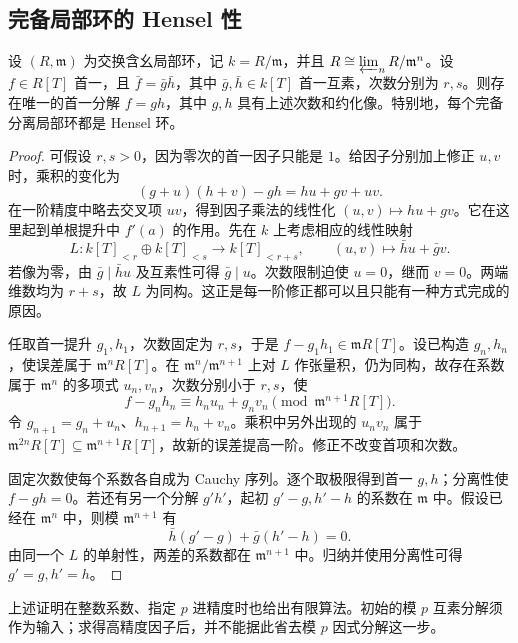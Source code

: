 \subsection{完备局部环的 Hensel 性}
\label{b3:subsec:2301:02}

\begin{theorem}\label{b3:thm:hensel-factor-lifting}
	设 \((R,\mathfrak m)\) 为交换含幺局部环，记 \(k=R/\mathfrak m\)，并且 \(R\cong\varprojlim_n R/\mathfrak m^n\)。设 \(f\in R[T]\) 首一，且 \(\bar f=\bar g\bar h\)，其中 \(\bar g,\bar h\in k[T]\) 首一互素，次数分别为 \(r,s\)。则存在唯一的首一分解 \(f=gh\)，其中 \(g,h\) 具有上述次数和约化像。特别地，每个完备分离局部环都是 Hensel 环。
\end{theorem}
\begin{proof}
	可假设 \(r,s>0\)，因为零次的首一因子只能是 \(1\)。给因子分别加上修正 \(u,v\) 时，乘积的变化为
	\[
		(g+u)(h+v)-gh=hu+gv+uv.
	\]
	在一阶精度中略去交叉项 \(uv\)，得到因子乘法的线性化 \((u,v)\mapsto hu+gv\)。它在这里起到单根提升中 \(f'(a)\) 的作用。先在 \(k\) 上考虑相应的线性映射
	\[
		L:k[T]_{<r}\oplus k[T]_{<s}\longrightarrow k[T]_{<r+s}, \qquad (u,v)\longmapsto\bar h u+\bar g v.
	\]
	若像为零，由 \(\bar g\mid\bar h u\) 及互素性可得 \(\bar g\mid u\)。次数限制迫使 \(u=0\)，继而 \(v=0\)。两端维数均为 \(r+s\)，故 \(L\) 为同构。这正是每一阶修正都可以且只能有一种方式完成的原因。

	任取首一提升 \(g_1,h_1\)，次数固定为 \(r,s\)，于是 \(f-g_1h_1\in\mathfrak m R[T]\)。设已构造 \(g_n,h_n\)，使误差属于 \(\mathfrak m^nR[T]\)。在 \(\mathfrak m^n/\mathfrak m^{n+1}\) 上对 \(L\) 作张量积，仍为同构，故存在系数属于 \(\mathfrak m^n\) 的多项式 \(u_n,v_n\)，次数分别小于 \(r,s\)，使
	\[
		f-g_nh_n\equiv h_nu_n+g_nv_n\pmod{\mathfrak m^{n+1}R[T]}.
	\]
	令 \(g_{n+1}=g_n+u_n\)、\(h_{n+1}=h_n+v_n\)。乘积中另外出现的 \(u_nv_n\) 属于 \(\mathfrak m^{2n}R[T]\subseteq\mathfrak m^{n+1}R[T]\)，故新的误差提高一阶。修正不改变首项和次数。

	固定次数使每个系数各自成为 Cauchy 序列。逐个取极限得到首一 \(g,h\)；分离性使 \(f-gh=0\)。若还有另一个分解 \(g'h'\)，起初 \(g'-g,h'-h\) 的系数在 \(\mathfrak m\) 中。假设已经在 \(\mathfrak m^n\) 中，则模 \(\mathfrak m^{n+1}\) 有
	\[
		\bar h(g'-g)+\bar g(h'-h)=0.
	\]
	由同一个 \(L\) 的单射性，两差的系数都在 \(\mathfrak m^{n+1}\) 中。归纳并使用分离性可得 \(g'=g,h'=h\)。
\end{proof}

上述证明在整数系数、指定 \(p\) 进精度时也给出有限算法。初始的模 \(p\) 互素分解须作为输入；求得高精度因子后，并不能据此省去模 \(p\) 因式分解这一步。

